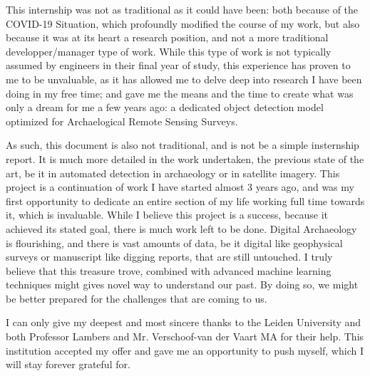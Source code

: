 This internship was not as traditional as it could have been: both because of the COVID-19 Situation, which profoundly modified the course of my work, but also because it was at its heart a research position, and not a more traditional developper/manager type of work. While this type of work is not typically assumed by engineers in their final year of study, this experience has proven to me to be unvaluable, as it has allowed me to delve deep into research I have been doing in my free time; and gave me the means and the time to create what was only a dream for me a few years ago: a dedicated object detection model optimized for Archaelogical Remote Sensing Surveys. 

As such, this document is also not traditional, and is not be a simple insternship report. It is much more detailed in the work undertaken, the previous state of the art, be it in automated detection in archaeology or in satellite imagery. This project is a continuation of work I have started almost 3 years ago, and was my first opportunity to dedicate an entire section of my life working full time towards it, which is invaluable. While I believe this project is a success, because it achieved its stated goal, there is much work left to be done. Digital Archaeology is flourishing, and there is vast amounts of data, be it digital like geophysical surveys or manuscript like digging reports, that are still untouched. I truly believe that this treasure trove, combined with advanced machine learning techniques might gives novel way to understand our past. By doing so, we might be better prepared for the challenges that are coming to us.

I can only give my deepest and most sincere thanks to the Leiden University and both Professor Lambers and Mr. Verschoof-van der Vaart MA for their help. This institution accepted my offer and gave me an opportunity to push myself, which I will stay forever grateful for. 


